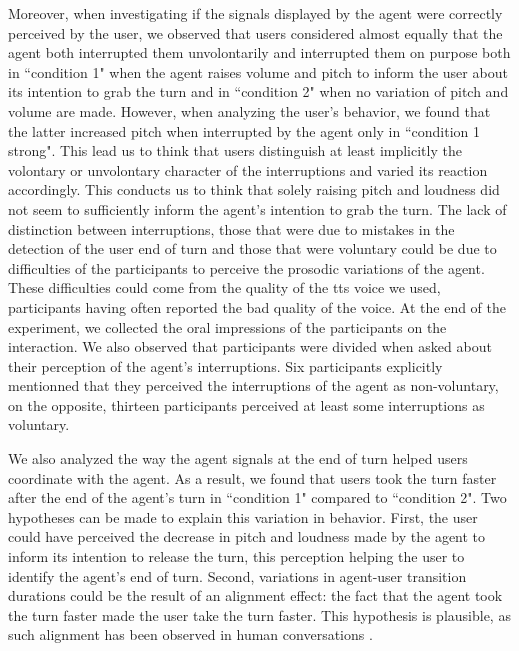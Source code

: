 Moreover, when investigating if the signals displayed by the agent were correctly perceived by the user, we observed that users considered almost equally that the agent both interrupted them unvolontarily and interrupted them on purpose both in ``condition 1" when the agent raises volume and pitch to inform the user about its intention to grab the turn and in ``condition 2" when no variation of pitch and volume are made. However, when analyzing the user's behavior, we found that the latter increased pitch when interrupted by the agent only in ``condition 1 strong". This lead us to think that users distinguish at least implicitly the volontary or unvolontary character of the interruptions and varied its reaction accordingly. This conducts us to think that solely raising pitch and loudness did not seem to sufficiently inform the agent's intention to grab the turn. The lack of distinction between interruptions, those that were due to mistakes in the detection of the user end of turn and those that were voluntary could be due to difficulties of the participants to perceive the prosodic variations of the agent. These difficulties could come from the quality of the tts voice we used, participants having often reported the bad quality of the voice. 
At the end of the experiment, we collected the oral impressions of the participants on the interaction. We also observed that participants were divided when asked about their perception of the agent's interruptions. Six participants explicitly mentionned that they perceived the interruptions of the agent as non-voluntary, on the opposite, thirteen participants perceived at least some interruptions as voluntary. 

We also analyzed the way the agent signals at the end of turn helped users coordinate with the agent. As a result, we found that users took the turn faster after the end of the agent's turn in ``condition 1" compared to ``condition 2". Two hypotheses can be made to explain this variation in behavior. First, the user could have perceived the decrease in pitch and loudness made by the agent to inform its intention to release the turn, this perception helping the user to identify the agent's end of turn. Second, variations in agent-user transition durations could be the result of an alignment effect: the fact that the agent took the turn faster made the user take the turn faster. This hypothesis is plausible, as such alignment has been observed in human conversations \citep{levitan_entrainment_2015}.  

